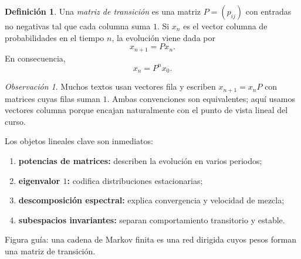 \documentclass[10pt,a4paper,oneside]{article}
\theoremstyle{plain}
\theoremstyle{definition}
\newtheorem{definition}[theorem]{Definición}
\theoremstyle{remark}
\newtheorem{remark}[theorem]{Observación}
\begin{document}
\begin{definition}
Una \emph{matriz de transición} es una matriz \(P=(p_{ij})\) con entradas no negativas tal que cada columna suma \(1\). Si \(x_n\) es el vector columna de probabilidades en el tiempo \(n\), la evolución viene dada por
\[
x_{n+1}=Px_n.
\]
En consecuencia,
\[
x_n=P^n x_0.
\]
\end{definition}

\begin{remark}
Muchos textos usan vectores fila y escriben \(x_{n+1}=x_nP\) con matrices cuyas filas suman \(1\). Ambas convenciones son equivalentes; aquí usamos vectores columna porque encajan naturalmente con el punto de vista lineal del curso.
\end{remark}

\begin{summaryBox}
Los objetos lineales clave son inmediatos:
\begin{enumerate}[label=\textup{(\arabic*)}]
\item \textbf{potencias de matrices:} describen la evolución en varios periodos;
\item \textbf{eigenvalor \(1\):} codifica distribuciones estacionarias;
\item \textbf{descomposición espectral:} explica convergencia y velocidad de mezcla;
\item \textbf{subespacios invariantes:} separan comportamiento transitorio y estable.
\end{enumerate}
\end{summaryBox}

\begin{center}

{\small Figura guía: una cadena de Markov finita es una red dirigida cuyos pesos forman una matriz de transición.}
\end{center}
\end{document}
